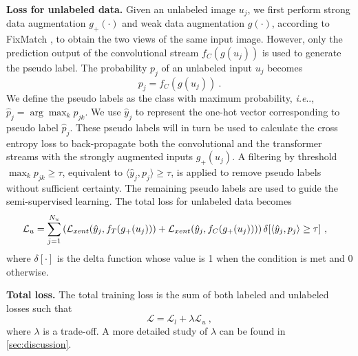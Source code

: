 \documentclass[runningheads]{llncs}
\makeatletter
\DeclareRobustCommand\onedot{\futurelet\@let@token\@onedot}
\def\@onedot{\ifx\@let@token.\else.\null\fi\xspace}
\def\ie{\emph{i.e}\onedot} \def\Ie{\emph{I.e}\onedot}
\newcommand{\fakeparagraph}[1]{\textbf{#1}}
\makeatother
\begin{document}
\fakeparagraph{Loss for unlabeled data.} Given an unlabeled image $u_j$, we first perform strong data augmentation $g_+(\cdot)$ and weak data augmentation $g(\cdot)$, according to FixMatch \cite{sohn2020fixmatch}, to obtain the two views of the same input image. However, only the prediction output of the convolutional stream $f_C(g(u_j))$ is used to generate the pseudo label.
The probability $p_j$ of an unlabeled input $u_j$ becomes
\begin{equation}
\label{eq:new_pred}
p_j = f_C(g(u_j))~.
\end{equation}
We define the pseudo labels as the class with maximum probability, \ie, $\hat p_j=\arg\max_k p_{jk}$. We use $\hat y_j$ to represent the one-hot vector corresponding to pseudo label $\hat p_j$. These pseudo labels will in turn be used to calculate the cross entropy loss to back-propagate both the convolutional and the transformer streams with the strongly augmented inputs $g_+(u_j)$.  A filtering by threshold $\max_k p_{jk}\ge\tau$, equivalent to $\langle\hat y_j,p_j\rangle\ge\tau$, is applied to remove pseudo labels without sufficient certainty. The remaining pseudo labels are used to guide the semi-supervised learning. 
The total loss for unlabeled data becomes
\begin{align}
\label{eq:new_lossu_T}
\small\mathcal L_u = \sum_{j=1}^{N_u}&\left(\mathcal L_{xent}(\hat y_j,f_T(g_+(u_j)))
+\mathcal L_{xent}(\hat y_j,f_C(g_+(u_j)))\right)\delta[\langle\hat y_j,p_j\rangle\ge\tau]~,
\end{align}
where $\delta[\cdot]$ is the delta function whose value is 1 when the condition is met and 0 otherwise. 

\fakeparagraph{Total loss.} The total training loss is the sum of both labeled and unlabeled losses such that
\begin{equation}
\label{eq:usloss2}
\mathcal L = \mathcal L_l+\lambda\mathcal L_{u}~,
\end{equation}
where $\lambda$ is a trade-off. A more detailed study of $\lambda$ can be found in \cref{sec:discussion}.
\end{document}
